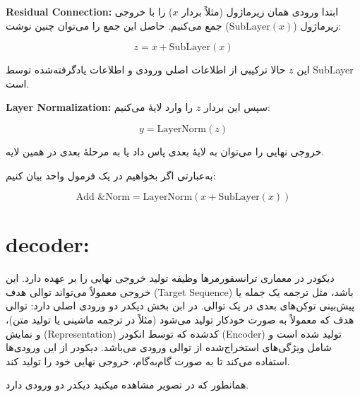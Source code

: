 \textbf{Residual Connection:} ابتدا ورودی همان زیرماژول (مثلاً بردار \( x \)) را با خروجی زیرماژول (\( \text{SubLayer}(x) \)) جمع می‌کنیم. حاصل این جمع را می‌توان چنین نوشت:

\[
z = x + \text{SubLayer}(x)
\]

این \( z \) حالا ترکیبی از اطلاعات اصلی ورودی و اطلاعات یادگرفته‌شده توسط SubLayer است.

\textbf{Layer Normalization:} سپس این بردار \( z \) را وارد لایهٔ  می‌کنیم:

\[
y = \text{LayerNorm}(z)
\]

خروجی نهایی را می‌توان به لایهٔ بعدی پاس داد یا به مرحلهٔ بعدی در همین لایه.

به‌عبارتی اگر بخواهیم در یک فرمول واحد بیان کنیم:

\[
\text{Add \& Norm} = \text{LayerNorm}\left(x + \text{SubLayer}(x)\right)
\]

\section{decoder:}

دیکودر  در معماری ترانسفورمرها وظیفه تولید خروجی نهایی را بر عهده دارد. این خروجی معمولاً می‌تواند توالی هدف (Target Sequence) باشد، مثل ترجمه یک جمله یا پیش‌بینی توکن‌های بعدی در یک توالی.
در ابن بخش دیکدر دو ورودی اصلی دارد:
 توالی هدف که معمولاً به صورت خودکار تولید می‌شود (مثلاً در ترجمه ماشینی یا تولید متن)، و نمایش (Representation) کدشده که توسط انکودر (Encoder) تولید شده است و شامل ویژگی‌های استخراج‌شده از توالی ورودی می‌باشد. دیکودر از این ورودی‌ها استفاده می‌کند تا به صورت گام‌به‌گام، خروجی نهایی خود را تولید کند.
 
 
 همانطور که در تصویر مشاهده میکنید دیکدر دو ورودی دارد.
 

